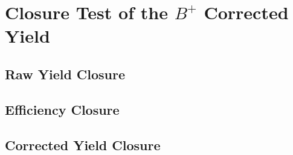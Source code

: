 \section{Closure Test of the $B^{+}$ Corrected Yield}
\label{sec:closuretest}

\subsection{Raw Yield Closure}

\subsection{Efficiency Closure}

\subsection{Corrected Yield Closure}


\clearpage
